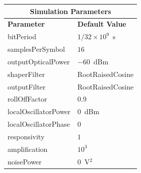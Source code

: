 \begin{refsection}
\begin{table}[H]
	\begin{tabular}{|l|l|}
		\hline
		\multicolumn{2}{|c|}{ \textbf{Simulation Parameters} } \\
		\hline
		\textbf{Parameter}     & \textbf{Default Value}                                     \\\hline
		bitPeriod              & $1/32\times10^9$~s														\\\hline
		samplesPerSymbol       & $16$                                                       \\\hline
		outputOpticalPower     & $-60$~dBm 													\\ \hline
		shaperFilter	       & RootRaisedCosine												\\ \hline
		outputFilter		   & RootRaisedCosine												\\ \hline
		rollOffFactor		   & 0.9														\\ \hline
		localOscillatorPower   & $0$~dBm                                                    \\ \hline
		localOscillatorPhase   & $0$                                                        \\ \hline
		responsivity           & $1$                                                        \\ \hline
		amplification          & $10^3$                                                     \\ \hline
		noisePower   & $0$~V$^2$                             					\\ \hline
	\end{tabular}
\end{table}
\begin{figure}[H]
	\centering


\end{figure}
\end{refsection}

